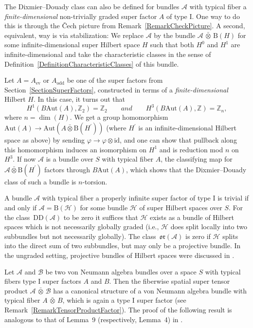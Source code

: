 \documentclass[10pt,a4paper]{amsart}
\numberwithin{equation}{section}
\newcommand{\Z}{\mathbb{Z}}
\newcommand{\B}{\mathrm{B}}
\newcommand{\Aut}{\mathrm{Aut}}
\newcommand{\DD}{\mathrm{DD}}
\newcommand{\oclass}{\mathfrak{or}}
\begin{document}
The Dixmier--Douady class can also be defined for bundles $\mathcal{A}$ with typical fiber a \emph{finite-dimensional} non-trivially graded super factor $A$ of type I.
One way to do this is through the \v{C}ech picture from Remark~\ref{RemarkCheckPicture}.
A second, equivalent, way is via stabilization: We replace $\mathcal{A}$ by the bundle $\mathcal{A} \,\bar{\otimes}\, \B(H)$ for some infinite-dimensional super Hilbert space $H$ such that both $H^0$ and $H^1$ are infinite-dimensional and take the characteristic classes in the sense of Definition~\ref{DefinitionCharacteristicClasses} of this bundle.

\begin{Remark}
Let $A = A_{\mathrm{ev}}$ or $A_{\mathrm{odd}}$ be one of the super factors from Section~\ref{SectionSuperFactors}, constructed in terms of a \emph{finite-dimensional} Hilbert $H$.
In this case, it turns out that
\[H^1(B\Aut(A), \Z_2) = \Z_2\qquad and \qquad H^3(B\Aut(A), \Z) = \Z_n,\]
 where $n = \dim(H)$.
We get a group homomorphism $\Aut(A) \to \Aut(A \bar{\otimes} \B(H^\prime))$ (where $H^\prime$ is an infinite-dimensional Hilbert space as above) by sending $\varphi \to \varphi \otimes \mathrm{id}$, and one can show that pullback along this homomorphism induces an isomorphism on $H^1$ and is reduction mod $n$ on~$H^3$.
If now $\mathcal{A}$ is a bundle over $S$ with typical fiber $A$, the classifying map for $\mathcal{A} \bar{\otimes} \B(H^\prime)$ factors through $B\Aut(A)$, which shows that the Dixmier--Douady class of such a bundle is $n$-torsion.
\end{Remark}

\begin{Remark}
A bundle $\mathcal{A}$ with typical fiber a properly infinite super factor of type I is trivial if and only if $\mathcal{A} = \B(\mathcal{H})$ for some bundle $\mathcal{H}$ of super Hilbert spaces over $S$.
For the class~$\DD(\mathcal{A})$ to be zero it suffices that $\mathcal{H}$ exists as a bundle of Hilbert spaces which is not necessarily globally graded (i.e., $\mathcal{H}$ does split locally into two subbundles but not necessarily globally).
The class~$\oclass(\mathcal{A})$ is zero if $\mathcal{H}$ splits into the direct sum of two subbundles, but may only be a projective bundle.
In the ungraded setting, projective bundles of Hilbert spaces were discussed in \cite{AtiyahSegalTwistedKtheory}.
\end{Remark}

Let $\mathcal{A}$ and $\mathcal{B}$ be two von Neumann algebra bundles over a space $S$ with typical fibers type I super factors $A$ and $B$.
Then the fiberwise spatial super tensor product $\mathcal{A} \,\bar{\otimes}\, \mathcal{B}$ has a canonical structure of a von Neumann algebra bundle with typical fiber $A \,\bar{\otimes}\, B$, which is again a type I super factor (see Remark~\ref{RemarkTensorProductFactor}).
The proof of the following result is analogous to that of Lemma~9 (respectively, Lemma~4) in \cite{DonovanKaroubi}.
\end{document}
